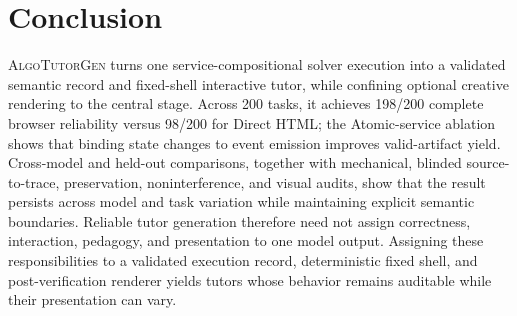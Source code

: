 \documentclass[letterpaper]{article}
\newcommand{\system}{\textsc{AlgoTutorGen}}
\begin{document}
\section{Conclusion}
\label{sec:conclusion}

\system{} turns one service-compositional solver execution into a
validated semantic record and fixed-shell interactive tutor, while
confining optional creative rendering to the central stage. Across 200
tasks, it achieves 198/200 complete browser reliability versus 98/200 for
Direct HTML; the Atomic-service ablation shows that binding state changes
to event emission improves valid-artifact yield. Cross-model and held-out
comparisons, together with mechanical, blinded source-to-trace,
preservation, noninterference, and visual audits, show that the result
persists across model and task variation while maintaining explicit
semantic boundaries. Reliable tutor generation therefore need not assign
correctness, interaction, pedagogy, and presentation to one model output.
Assigning these responsibilities to a validated execution record,
deterministic fixed shell, and post-verification renderer yields tutors
whose behavior remains auditable while their presentation can vary.

\FloatBarrier

\clearpage

\end{document}
